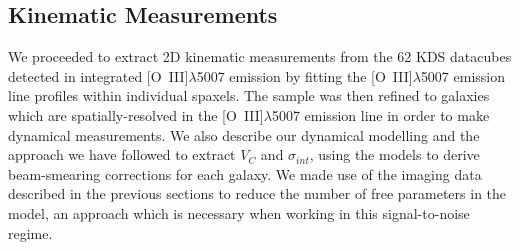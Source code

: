 \documentclass[fleqn,usenatbib]{mnras}
\begin{document}

\subsection{Kinematic Measurements}\label{subsection:kinematic_measurements}

We proceeded to extract 2D kinematic measurements from the 62 KDS datacubes detected in integrated [O~{\sc III}]$\lambda$5007 emission by fitting the [O~{\sc III}]$\lambda$5007 emission line profiles within individual spaxels.
The sample was then refined to galaxies which are spatially-resolved in the [O~{\sc III}]$\lambda$5007 emission line in order to make dynamical measurements.
We also describe our dynamical modelling and the approach we have followed to extract $V_{C}$ and $\sigma_{int}$, using the models to derive beam-smearing corrections for each galaxy.
We made use of the imaging data described in the previous sections to reduce the number of free parameters in the model, an approach which is necessary when working in this signal-to-noise regime.  
\end{document}
